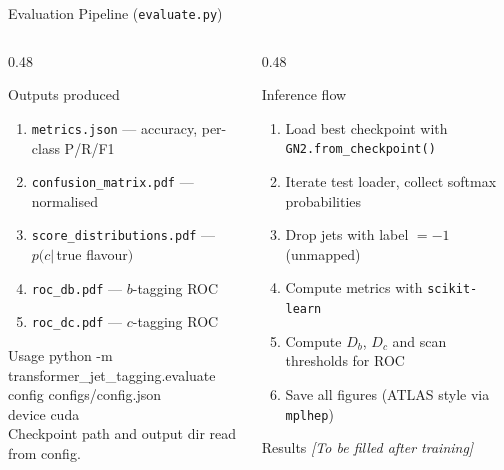 \documentclass[aspectratio=169, 10pt]{beamer}
\begin{document}
\begin{frame}{Evaluation Pipeline (\texttt{evaluate.py})}
\begin{columns}[T]
  \begin{column}{0.48\textwidth}
    \begin{block}{Outputs produced}
      \begin{enumerate}
        \item \texttt{metrics.json} --- accuracy, per-class P/R/F1
        \item \texttt{confusion\_matrix.pdf} --- normalised
        \item \texttt{score\_distributions.pdf} --- $p(c|$\,true flavour$)$
        \item \texttt{roc\_db.pdf} --- $b$-tagging ROC
        \item \texttt{roc\_dc.pdf} --- $c$-tagging ROC
      \end{enumerate}
    \end{block}
    \begin{block}{Usage}
      \ttfamily\footnotesize
      python -m transformer\_jet\_tagging.evaluate\\
      \hspace{1em}{-}{-}config configs/config.json\\
      \hspace{1em}{-}{-}device cuda
      \normalfont\normalsize\\[2pt]
      Checkpoint path and output dir read from config.
    \end{block}
  \end{column}
  \begin{column}{0.48\textwidth}
    \begin{block}{Inference flow}
      \begin{enumerate}
        \item Load best checkpoint with \texttt{GN2.from\_checkpoint()}
        \item Iterate test loader, collect softmax probabilities
        \item Drop jets with label $= -1$ (unmapped)
        \item Compute metrics with \texttt{scikit-learn}
        \item Compute $D_b$, $D_c$ and scan thresholds for ROC
        \item Save all figures (ATLAS style via \texttt{mplhep})
      \end{enumerate}
    \end{block}
    \begin{alertblock}{Results}
      \centering
      \textit{[To be filled after training]}
    \end{alertblock}
  \end{column}
\end{columns}
\end{frame}
\end{document}
